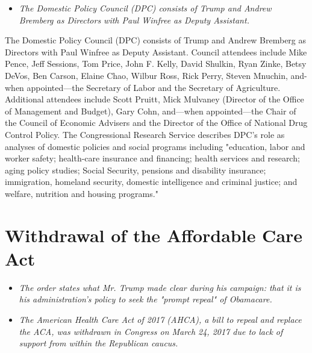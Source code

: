 \begin{itemize}
\item
  \emph{The Domestic Policy Council (DPC) consists of Trump and Andrew
  Bremberg as Directors with Paul Winfree as Deputy Assistant.}
\end{itemize}

The Domestic Policy Council (DPC) consists of Trump and Andrew Bremberg
as Directors with Paul Winfree as Deputy Assistant. Council attendees
include Mike Pence, Jeff Sessions, Tom Price, John F. Kelly, David
Shulkin, Ryan Zinke, Betsy DeVos, Ben Carson, Elaine Chao, Wilbur Ross,
Rick Perry, Steven Mnuchin, and-when appointed---the Secretary of Labor
and the Secretary of Agriculture. Additional attendees include Scott
Pruitt, Mick Mulvaney (Director of the Office of Management and Budget),
Gary Cohn, and---when appointed---the Chair of the Council of Economic
Advisers and the Director of the Office of National Drug Control Policy.
The Congressional Research Service describes DPC's role as analyses of
domestic policies and social programs including "education, labor and
worker safety; health-care insurance and financing; health services and
research; aging policy studies; Social Security, pensions and disability
insurance; immigration, homeland security, domestic intelligence and
criminal justice; and welfare, nutrition and housing programs."

\section{Withdrawal of the Affordable Care
Act}\label{withdrawal-of-the-affordable-care-act}

\begin{itemize}
\item
  \emph{The order states what Mr. Trump made clear during his campaign:
  that it is his administration's policy to seek the "prompt repeal" of
  Obamacare.}
\item
  \emph{The American Health Care Act of 2017 (AHCA), a bill to repeal
  and replace the ACA, was withdrawn in Congress on March 24, 2017 due
  to lack of support from within the Republican caucus.}
\end{itemize}

